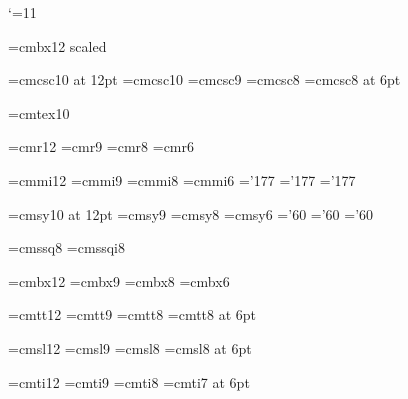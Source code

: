 %

\catcode`\@=11

\font\seventeenbf=cmbx12 scaled

\font\twelvecsc=cmcsc10 at 12pt
\font\tencsc=cmcsc10		%
\font\ninecsc=cmcsc9
\font\eightcsc=cmcsc8
\font\sixcsc=cmcsc8 at 6pt

\font\tentex=cmtex10		%

\font\twelverm=cmr12
\font\ninerm=cmr9		%
\font\eightrm=cmr8
\font\sixrm=cmr6

\font\twelvei=cmmi12
\font\ninei=cmmi9		%
\font\eighti=cmmi8
\font\sixi=cmmi6
\skewchar\ninei='177 \skewchar\eighti='177 \skewchar\sixi='177

\font\twelvesy=cmsy10 at 12pt
\font\ninesy=cmsy9		%
\font\eightsy=cmsy8
\font\sixsy=cmsy6
\skewchar\ninesy='60 \skewchar\eightsy='60 \skewchar\sixsy='60

\font\eightss=cmssq8		%
\font\eightssi=cmssqi8

\font\twelvebf=cmbx12
\font\ninebf=cmbx9		%
\font\eightbf=cmbx8
\font\sixbf=cmbx6

\font\twelvett=cmtt12
\font\ninett=cmtt9		%
\font\eighttt=cmtt8
\font\sixtt=cmtt8 at 6pt

\hyphenchar{} %
\hyphenchar{}
\hyphenchar{}

\font\twelvesl=cmsl12
\font\ninesl=cmsl9
\font\eightsl=cmsl8
\font\sixsl=cmsl8 at 6pt

\font\twelveit=cmti12
\font\nineit=cmti9
\font\eightit=cmti8
\font\sixit=cmti7 at 6pt

%
%

\newskip\ttglue

\def\twelvepoint{\def\rm{\fam0\twelverm}%
  \textfont0=\twelverm \scriptfont0=\eightrm \scriptscriptfont0=\sixrm
  \textfont1=\twelvei  \scriptfont1=\eighti  \scriptscriptfont1=\sixi
  \textfont2=\twelvesy \scriptfont2=\eightsy \scriptscriptfont2=\sixsy
  \textfont3=\tenex \scriptfont3=\tenex   \scriptscriptfont3=\tenex
  \def\it{\fam\itfam\twelveit}%
  \textfont\itfam=\twelveit
  \def\sl{\fam\slfam\twelvesl}%
  \textfont\slfam=\twelvesl
  \def\bf{\fam\bffam\twelvebf}%
  \textfont\bffam=\twelvebf \scriptfont\bffam=\eightbf
   \scriptscriptfont\bffam=\sixbf
  \def\tt{\fam\ttfam\twelvett}%
  \textfont\ttfam=\twelvett
  \tt \ttglue=.5em plus.25em minus.15em
  \normalbaselineskip=13pt
  \let\sc=\twelvecsc
  \let\big=\twelvebig
  \setbox\strutbox=\hbox{\vrule height9pt depth4pt width\z@}%
  \normalbaselines\rm}

